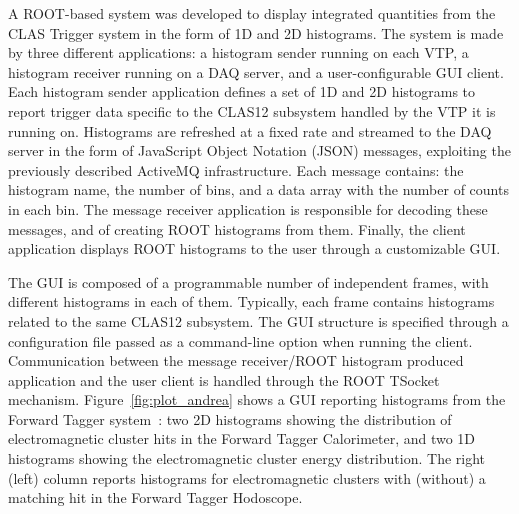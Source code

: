 A ROOT-based system was developed to display integrated quantities from the CLAS Trigger system in the form of 1D
and 2D histograms. The system is made by three different applications: a histogram sender running on each VTP, a
histogram receiver running on a DAQ server, and a user-configurable GUI client. Each histogram sender application
defines a set of 1D and 2D histograms to report trigger data specific to the CLAS12 subsystem handled by the VTP it is
running on. Histograms are refreshed at a fixed rate and streamed to the DAQ server in the form of JavaScript Object
Notation (JSON) messages, exploiting the previously described ActiveMQ infrastructure. Each message contains: the
histogram name, the number of bins, and a data array with the number of counts in each bin. The message receiver
application is responsible for decoding these messages, and of creating ROOT histograms from them. Finally, the client
application displays ROOT histograms to the user through a customizable GUI.

The GUI is composed of a programmable number of independent frames, with different histograms in each of them.
Typically, each frame contains histograms related to the same CLAS12 subsystem. The GUI structure is specified through
a configuration file passed as a command-line option when running the client. Communication between the message
receiver/ROOT histogram produced application and the user client is handled through the ROOT TSocket mechanism.
Figure~\ref{fig:plot_andrea} shows a GUI reporting histograms from the Forward Tagger system~\cite{ft-ref}: two
2D histograms showing the distribution of electromagnetic cluster hits in the Forward Tagger Calorimeter, and two
1D histograms showing the electromagnetic cluster energy distribution. The right (left) column reports histograms for
electromagnetic clusters  with (without) a matching hit in the Forward Tagger Hodoscope.

